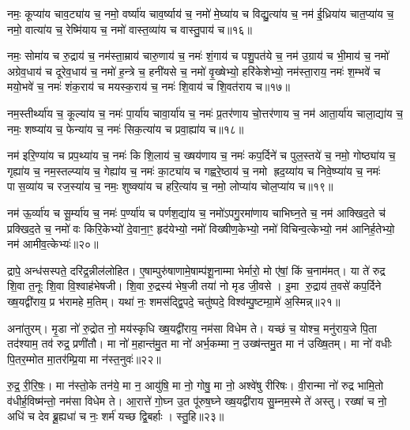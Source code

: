 नमः॒ कूप्या॑य चाव॒ट्या॑य च॒ नमो॒ वर्ष्या॑य चाव॒र्ष्याय॑ च॒ नमो॑ मे॒घ्या॑य च विद्यु॒त्या॑य च॒ नम॑ ई॒ध्रिया॑य चात॒प्या॑य च॒ नमो॒ वात्या॑य च॒ रेष्मि॑याय च॒ नमो॑ वास्त॒व्या॑य च वास्तु॒पाय॑ च॥१६॥

{\anuvakamend[{वै॒श॒न्ताय॑ च त्रि॒ꣳ॒शच्च॑॥७॥}]}

नमः॒ सोमा॑य च रु॒द्राय॑ च॒ नम॑स्ता॒म्राय॑ चारु॒णाय॑ च॒ नमः॑ शं॒गाय॑ च पशु॒पत॑ये च॒ नम॑ उ॒ग्राय॑ च भी॒माय॑ च॒ नमो॑ अग्रेव॒धाय॑ च दूरेव॒धाय॑ च॒ नमो॑ ह॒न्त्रे च॒ हनी॑यसे च॒ नमो॑ वृ॒ख्षेभ्यो॒ हरि॑केशेभ्यो॒ नम॑स्ता॒राय॒ नमः॑ श॒म्भवे॑ च मयो॒भवे॑ च॒ नमः॑ शंक॒राय॑ च मयस्क॒राय॑ च॒ नमः॑ शि॒वाय॑ च शि॒वत॑राय च॥१७॥

नम॒स्तीर्थ्या॑य च॒ कूल्या॑य च॒ नमः॑ पा॒र्या॑य चावा॒र्या॑य च॒ नमः॑ प्र॒तर॑णाय चो॒त्तर॑णाय च॒ नम॑ आता॒र्या॑य चाला॒द्या॑य च॒ नमः॒ शष्प्या॑य च॒ फेन्या॑य च॒ नमः॑ सिक॒त्या॑य च प्रवा॒ह्या॑य च॥१८॥

{\anuvakamend[{शि॒वत॑राय च त्रि॒ꣳ॒शच्च॑॥८॥}]}

नम॑ इरि॒ण्या॑य च प्रप॒थ्या॑य च॒ नमः॑ किशि॒लाय॑ च॒ ख्षय॑णाय च॒ नमः॑ कप॒र्दिने॑ च पुल॒स्तये॑ च॒ नमो॒ गोष्ठ्या॑य च॒ गृह्या॑य च॒ नम॒स्तल्प्या॑य च॒ गेह्या॑य च॒ नमः॑ का॒ट्या॑य च गह्वरे॒ष्ठाय॑ च॒ नमो ह्रद॒य्या॑य च निवे॒ष्प्या॑य च॒ नमः॑ पास॒व्या॑य च रज॒स्या॑य च॒ नमः॒ शुष्क्या॑य च हरि॒त्या॑य च॒ नमो॒ लोप्या॑य चोल॒प्या॑य च॥१९॥

नम॑ ऊ॒र्व्या॑य च सू॒र्म्या॑य च॒ नमः॑ प॒र्ण्या॑य च पर्णश॒द्या॑य च॒ नमो॑ऽपगु॒रमा॑णाय चाभिघ्न॒ते च॒ नम॑ आक्खिद॒ते च॑ प्रक्खिद॒ते च॒ नमो॑ वः किरि॒केभ्यो॑ दे॒वाना॒ꣳ॒ हृद॑येभ्यो॒ नमो॑ विख्षीण॒केभ्यो॒ नमो॑ विचिन्व॒त्केभ्यो॒ नम॑ आनिर्\mbox{}ह॒तेभ्यो॒ नम॑ आमीव॒त्केभ्यः॑॥२०॥

{\anuvakamend[{उ॒ल॒प्या॑य च॒ त्रय॑स्त्रिशच्च॥९॥}]}

द्रापे॒ अन्ध॑सस्पते॒ दरि॑द्र॒न्नील॑लोहित। ए॒षाम्पुरु॑षाणामे॒षाम्प॑शू॒नाम्मा भेर्मारो॒ मो ए॑षां॒ किं च॒नाम॑मत्। या ते॑ रुद्र शि॒वा त॒नूः शि॒वा वि॒श्वाह॑भेषजी। शि॒वा रु॒द्रस्य॑ भेष॒जी तया॑ नो मृड जी॒वसे। इ॒मा रु॒द्राय॑ त॒वसे॑ कप॒र्दिने ख्ष॒यद्वी॑राय॒ प्र भ॑रामहे म॒तिम्। यथा॑ नः॒ शमस॑द्द्वि॒पदे॒ चतु॑ष्पदे॒ विश्व॑म्पु॒ष्टम्ग्रा॒मे॑ अ॒स्मिन्न्॥२१॥

अना॑तुरम्। मृ॒डा नो॑ रु॒द्रोत नो॒ मय॑स्कृधि ख्ष॒यद्वी॑राय॒ नम॑सा विधेम ते। यच्छं च॒ योश्च॒ मनु॑राय॒जे पि॒ता तद॑श्याम॒ तव॑ रुद्र॒ प्रणी॑तौ। मा नो॑ म॒हान्त॑मु॒त मा नो॑ अर्भ॒कम्मा न॒ उख्ष॑न्तमु॒त मा न॑ उख्षि॒तम्। मा नो॑ वधीः पि॒तर॒म्मोत मा॒तर॑म्प्रि॒या मा न॑स्त॒नुवः॑॥२२॥

रु॒द्र॒ री॒रि॒षः॒। मा न॑स्तो॒के तन॑ये॒ मा न॒ आयु॑षि॒ मा नो॒ गोषु॒ मा नो॒ अश्वे॑षु रीरिषः। वी॒रान्मा नो॑ रुद्र भामि॒तो व॑धीर्\mbox{}ह॒विष्म॑न्तो॒ नम॑सा विधेम ते। आ॒रात्ते॑ गो॒घ्न उ॒त पू॑रुष॒घ्ने ख्ष॒यद्वी॑राय सु॒म्नम॒स्मे ते॑ अस्तु। रख्षा॑ च नो॒ अधि॑ च देव ब्रू॒ह्यधा॑ च नः॒ शर्म॑ यच्छ द्वि॒बर्\mbox{}हाः। स्तु॒हि॥२३॥

